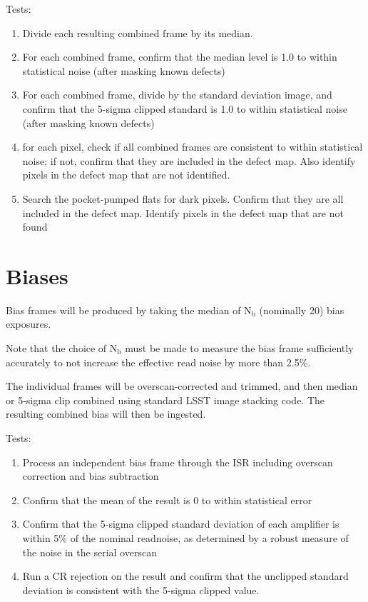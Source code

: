 \documentclass[DM,authoryear,toc,lsstdraft]{lsstdoc}
\begin{document}
Tests:
\begin{enumerate}
\item Divide each resulting combined frame by its median.
\item For each combined frame, confirm that the median level is 1.0 to within statistical noise
(after masking known defects)
\item For each combined frame, divide by the standard deviation image, and confirm that the 5-sigma
clipped standard is 1.0 to within statistical noise (after masking known defects)
\item for each pixel, check if all combined frames are consistent to within statistical noise;
if not, confirm that they are included in the defect map.  Also identify pixels in the
defect map that are not identified.
\item Search the pocket-pumped flats for dark pixels.  Confirm that they are all included in
the defect map.  Identify pixels in the defect map that are not found
\end{enumerate}

\section{Biases}

Bias frames will be produced by taking the median of N$_{\text{b}}$ (nominally 20) bias exposures.

Note that the choice of N$_{\text{b}}$ must be made to measure the bias frame sufficiently accurately to not
increase the effective read noise by more than 2.5\%.

The individual frames will be overscan-corrected and trimmed, and then median or 5-sigma clip combined using
standard LSST image stacking code.  The resulting combined bias will then be ingested.

Tests:
\begin{enumerate}
\item Process an independent bias frame through the ISR including overscan correction and bias subtraction
\item Confirm that the mean of the result is 0 to within statistical error
\item Confirm that the 5-sigma clipped standard deviation of each amplifier is within 5\% of
the nominal readnoise, as determined by a robust measure of the noise in the serial overscan
\item Run a CR rejection on the result and confirm that the unclipped standard deviation is
consistent with the 5-sigma clipped value.
\end{enumerate}
\end{document}
